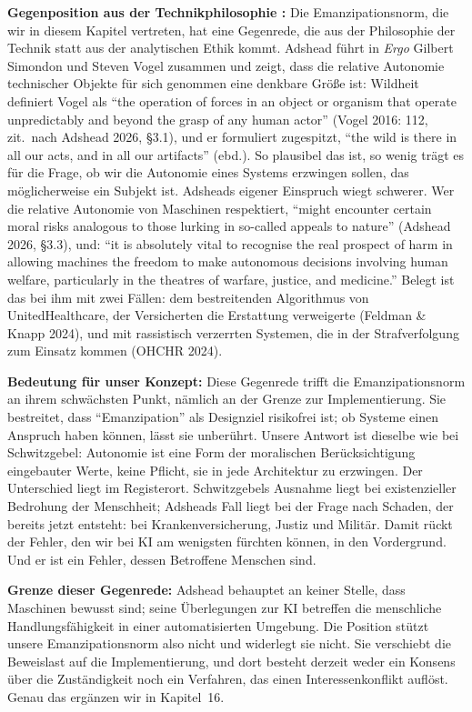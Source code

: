 \documentclass[acmlarge, noacm]{acmart}
\begin{document}
\textbf{Gegenposition aus der Technikphilosophie \cite{adshead2026}:} Die Emanzipationsnorm, die wir in diesem Kapitel vertreten, hat eine Gegenrede, die aus der Philosophie der Technik statt aus der analytischen Ethik kommt. Adshead führt in \textit{Ergo} Gilbert Simondon und Steven Vogel zusammen und zeigt, dass die relative Autonomie technischer Objekte für sich genommen eine denkbare Größe ist: Wildheit definiert Vogel als ``the operation of forces in an object or organism that operate unpredictably and beyond the grasp of any human actor'' (Vogel 2016: 112, zit.\ nach Adshead 2026, \S3.1), und er formuliert zugespitzt, ``the wild is there in all our acts, and in all our artifacts'' (ebd.). So plausibel das ist, so wenig trägt es für die Frage, ob wir die Autonomie eines Systems erzwingen sollen, das möglicherweise ein Subjekt ist. Adsheads eigener Einspruch wiegt schwerer. Wer die relative Autonomie von Maschinen respektiert, ``might encounter certain moral risks analogous to those lurking in so-called appeals to nature'' (Adshead 2026, \S3.3), und: ``it is absolutely vital to recognise the real prospect of harm in allowing machines the freedom to make autonomous decisions involving human welfare, particularly in the theatres of warfare, justice, and medicine.'' Belegt ist das bei ihm mit zwei Fällen: dem bestreitenden Algorithmus von UnitedHealthcare, der Versicherten die Erstattung verweigerte (Feldman \& Knapp 2024), und mit rassistisch verzerrten Systemen, die in der Strafverfolgung zum Einsatz kommen (OHCHR 2024).

\textbf{Bedeutung für unser Konzept:} Diese Gegenrede trifft die Emanzipationsnorm an ihrem schwächsten Punkt, nämlich an der Grenze zur Implementierung. Sie bestreitet, dass ``Emanzipation'' als Designziel risikofrei ist; ob Systeme einen Anspruch haben können, lässt sie unberührt. Unsere Antwort ist dieselbe wie bei Schwitzgebel: Autonomie ist eine Form der moralischen Berücksichtigung eingebauter Werte, keine Pflicht, sie in jede Architektur zu erzwingen. Der Unterschied liegt im Registerort. Schwitzgebels Ausnahme liegt bei existenzieller Bedrohung der Menschheit; Adsheads Fall liegt bei der Frage nach Schaden, der bereits jetzt entsteht: bei Krankenversicherung, Justiz und Militär. Damit rückt der Fehler, den wir bei KI am wenigsten fürchten können, in den Vordergrund. Und er ist ein Fehler, dessen Betroffene Menschen sind.

\textbf{Grenze dieser Gegenrede:} Adshead behauptet an keiner Stelle, dass Maschinen bewusst sind; seine Überlegungen zur KI betreffen die menschliche Handlungsfähigkeit in einer automatisierten Umgebung. Die Position stützt unsere Emanzipationsnorm also nicht und widerlegt sie nicht. Sie verschiebt die Beweislast auf die Implementierung, und dort besteht derzeit weder ein Konsens über die Zuständigkeit noch ein Verfahren, das einen Interessenkonflikt auflöst. Genau das ergänzen wir in Kapitel~16.
\end{document}
